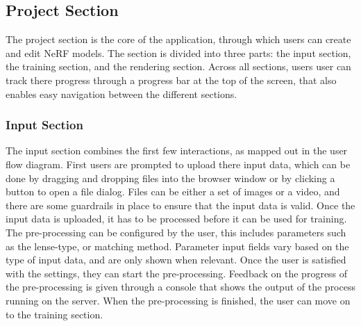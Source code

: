 \subsection{Project Section}

The project section is the core of the application, through which users can create and edit NeRF models.
The section is divided into three parts: the input section, the training section, and the rendering section.
Across all sections, users user can track there progress through a progress bar at the top of the screen, that also enables easy navigation between the different sections.

\subsubsection{Input Section}

The input section combines the first few interactions, as mapped out in the user flow diagram.
First users are prompted to upload there input data, which can be done by dragging and dropping files into the browser window or by clicking a button to open a file dialog.
Files can be either a set of images or a video, and there are some guardrails in place to ensure that the input data is valid.
Once the input data is uploaded, it has to be processed before it can be used for training. 
The pre-processing can be configured by the user, this includes parameters such as the lense-type, or matching method.
Parameter input fields vary based on the type of input data, and are only shown when relevant.
Once the user is satisfied with the settings, they can start the pre-processing.
Feedback on the progress of the pre-processing is given through a console that shows the output of the process running on the server.
When the pre-processing is finished, the user can move on to the training section. 

